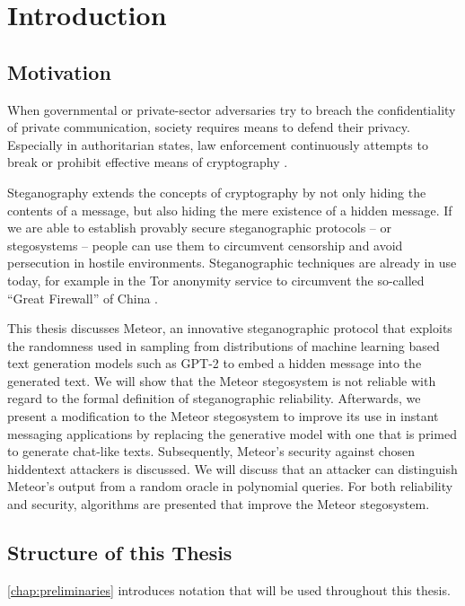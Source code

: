 \chapter{Introduction}

\section{Motivation}

When governmental or private-sector adversaries try to breach the confidentiality of private communication, society requires means to defend their privacy.
Especially in authoritarian states, law enforcement continuously attempts to break or prohibit effective means of cryptography \cite{TLSBlocking2020}.

Steganography extends the concepts of cryptography by not only hiding the contents of a message, but also hiding the mere existence of a hidden message.
If we are able to establish provably secure steganographic protocols -- or stegosystems -- people can use them to circumvent censorship and avoid persecution in hostile environments.
Steganographic techniques are already in use today, for example in the Tor anonymity service to circumvent the so-called ``Great Firewall'' of China \cite{TorBlocking2012}.

This thesis discusses Meteor, an innovative steganographic protocol that exploits the randomness used in sampling from distributions of machine learning based text generation models such as GPT-2 to embed a hidden message into the generated text.
We will show that the Meteor stegosystem is not reliable with regard to the formal definition of steganographic reliability.
Afterwards, we present a modification to the Meteor stegosystem to improve its use in instant messaging applications by replacing the generative model with one that is primed to generate chat-like texts.
Subsequently, Meteor's security against chosen hiddentext attackers is discussed.
We will discuss that an attacker can distinguish Meteor's output from a random oracle in polynomial queries.
For both reliability and security, algorithms are presented that improve the Meteor stegosystem.


\section{Structure of this Thesis}

\autoref{chap:preliminaries} introduces notation that will be used throughout this thesis.

